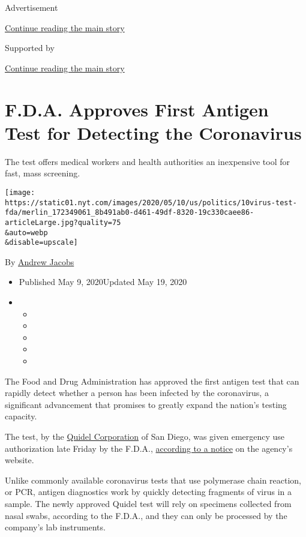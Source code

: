 Advertisement

\protect\hyperlink{after-top}{Continue reading the main story}

Supported by

\protect\hyperlink{after-sponsor}{Continue reading the main story}

\hypertarget{fda-approves-first-antigen-test-for-detecting-the-coronavirus}{%
\section{F.D.A. Approves First Antigen Test for Detecting the
Coronavirus}\label{fda-approves-first-antigen-test-for-detecting-the-coronavirus}}

The test offers medical workers and health authorities an inexpensive
tool for fast, mass screening.

\texttt{[image: https://static01.nyt.com/images/2020/05/10/us/politics/10virus-test-fda/merlin\_172349061\_8b491ab0-d461-49df-8320-19c330caee86-articleLarge.jpg?quality=75\\\&auto=webp\\\&disable=upscale]}

By \href{https://www.nytimes.com/by/andrew-jacobs}{Andrew Jacobs}

\begin{itemize}
\item
  Published May 9, 2020Updated May 19, 2020
\item
  \begin{itemize}
  \item
  \item
  \item
  \item
  \item
  \end{itemize}
\end{itemize}

The Food and Drug Administration has approved the first antigen test
that can rapidly detect whether a person has been infected by the
coronavirus, a significant advancement that promises to greatly expand
the nation's testing capacity.

The test, by the
\href{https://ir.quidel.com/news/news-release-details/2020/Quidel-Receives-Emergency-Authorization-for-Rapid-Antigen-COVID-19-Diagnostic-Assay/default.aspx}{Quidel
Corporation} of San Diego, was given emergency use authorization late
Friday by the F.D.A.,
\href{https://www.fda.gov/media/137886/download}{according to a notice}
on the agency's website.

Unlike commonly available coronavirus tests that use polymerase chain
reaction, or PCR, antigen diagnostics work by quickly detecting
fragments of virus in a sample. The newly approved Quidel test will rely
on specimens collected from nasal swabs, according to the F.D.A., and
they can only be processed by the company's lab instruments.

